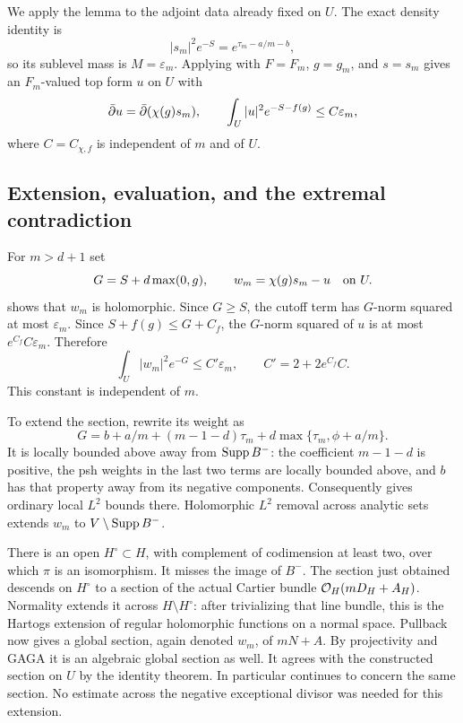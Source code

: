 We apply the lemma to the adjoint data already fixed on $U$.
The exact density identity is
\begin{equation}\label{eq:normalized-top-density}
 |s_m|^2e^{-S}=e^{\tau_m-a/m-b},
\end{equation}
so its sublevel mass is $M=\varepsilon_m$. Applying
 with $F=F_m$, $g=g_m$, and $s=s_m$ gives an
$F_m$-valued top form $u$ on $U$ with
\begin{equation}\label{eq:singular-cutoff-estimate}
 \bar\partial u=\bar\partial(\chi(g)s_m),\qquad
 \int_U |u|^2e^{-S-f(g)}\le C\varepsilon_m,
\end{equation}
where $C=C_{\chi,f}$ is independent of $m$ and of $U$.

\subsection{Extension, evaluation, and the extremal contradiction}

For $m>d+1$ set
\[
 G=S+d\max(0,g),\qquad w_m=\chi(g)s_m-u\quad\hbox{on }U.
\]
 shows that $w_m$ is holomorphic.  Since $G\ge S$, the cutoff term has $G$-norm squared at
most $\varepsilon_m$.  Since $S+f(g)\le G+C_f$, the $G$-norm squared
of $u$ is at most $e^{C_f}C\varepsilon_m$.  Therefore
\begin{equation}\label{eq:competitor-norm}
 \int_U |w_m|^2e^{-G}\le C'\varepsilon_m,
 \qquad C'=2+2e^{C_f}C.
\end{equation}
This constant is independent of $m$.

To extend the section, rewrite its weight as
\begin{equation}\label{eq:extension-weight}
 G=b+a/m+(m-1-d)\tau_m
           +d\max\{\tau_m,\phi+a/m\}.
\end{equation}
It is locally bounded above away from $\operatorname{Supp} B^-$: the coefficient
$m-1-d$ is positive, the psh weights in the last two terms are locally
bounded above, and $b$ has that property away from its negative
components.  Consequently  gives ordinary
local $L^2$ bounds there.  Holomorphic $L^2$ removal across analytic
sets extends $w_m$ to $V\setminus\operatorname{Supp} B^-$.

There is an open $H^\circ\subset H$, with complement of codimension
at least two, over which $\pi$ is an isomorphism.  It misses the image
of $B^-$.  The section just obtained descends on $H^\circ$ to a
section of the actual Cartier bundle
$\mathcal O_H(mD_H+A_H)$.  Normality extends it across $H\setminus
H^\circ$: after trivializing that line bundle, this is the Hartogs
extension of regular holomorphic functions on a normal space.
Pullback now gives a global section, again denoted $w_m$, of $mN+A$.
By projectivity and GAGA it is an algebraic global section as well.
It agrees with the constructed section on $U$ by the identity theorem.
In particular  continues to concern the same
section.  No estimate across the negative exceptional divisor was
needed for this extension.

